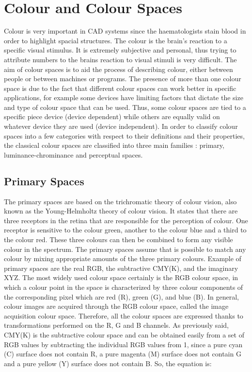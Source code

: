 \documentclass[final,a4paper,12pt,english]{UnicaPhdThesis3}
\begin{document}
\section{Colour and Colour Spaces} %
Colour is very important in CAD systems since the haematologists stain blood in order to highlight spacial structures. The colour is the brain's reaction to a specific visual stimulus. It is  extremely subjective and personal, thus trying to attribute numbers to the brains reaction to visual stimuli is very difficult. The aim of colour spaces is to aid the process of describing colour, either between people or between machines or programs. The presence of more than one colour space is due to the fact that different colour spaces can work better in specific applications, for example some devices have limiting factors that dictate the size and type of colour space that can be used. Thus, some colour spaces are tied to a specific piece device (device dependent) while others are equally valid on whatever device they are used (device independent). In order to classify colour spaces into a few categories with respect to their definitions and their properties, the classical colour spaces are classified into three main families \cite{Vandenbroucke, Busin}: primary, luminance-chrominance and perceptual spaces.

\subsection{Primary Spaces}  %
The primary spaces are based on the trichromatic theory of colour vision, also known as the Young-Helmholtz theory of colour vision. It states that there are three receptors in the retina that are responsible for the perception of colour. One receptor is sensitive to the colour green, another to the colour blue and a third to the colour red. These three colours can then be combined to form any visible colour in the spectrum.
The primary spaces assume that is possible to match any colour by mixing appropriate amounts of the three primary colours. Example of primary spaces are the real RGB, the subtractive CMY(K), and the imaginary XYZ. The most widely used colour space certainly is the RGB colour space, in which a colour point in the space is characterized by three colour components of the corresponding pixel which are red (R), green (G), and blue (B). In general, colour images are acquired through the RGB colour space, called the image acquisition colour space. Therefore, all the colour spaces are expressed thanks to transformations performed on the R, G and B channels.
As previously said, CMY(K) is the subtractive colour space and can be obtained easily from a set of RGB values by subtracting the individual RGB values from 1, since a pure cyan (C) surface does not contain R, a pure magenta (M) surface does not contain G and a pure yellow (Y) surface does not contain B. So, the equation is:
 
\end{document}
